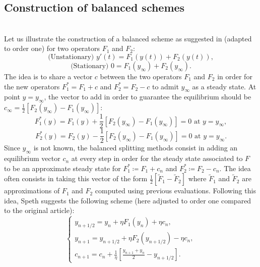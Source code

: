 \documentclass[article,authoryear,jmlmc]{beg_32}             %
\begin{document}
\subsection{Construction of balanced schemes}
~~\\
Let us illustrate the construction of a balanced scheme as suggested in \cite{rebalanced_splitting} (adapted to order one) for two operators $F_1$ and $F_2$:
\begin{equation*}
	\text{(Unstationary) } y'(t) = F_1(y(t)) + F_2(y(t)),
\end{equation*}
\begin{equation*}
	\text{(Stationary) } 0 = F_1(y_{\infty}) + F_2(y_{\infty}).
\end{equation*}
The idea is to share a vector $c$ between the two operators $F_1$ and $F_2$ in order for the new operators $F_1^* = F_1+c$ and $F_2^*=F_2-c$ to admit $y_{\infty}$ as a steady state. At point $y=y_{\infty}$, the vector to add in order to guarantee the equilibrium should be $c_{\infty} = \frac{1}{2} \left[F_2(y_{\infty})-F_1(y_{\infty})\right]$:
\begin{equation*}
	F_1^*(y) =  F_1(y) + \frac{1}{2} \left[F_2(y_{\infty})-F_1(y_{\infty})\right] = 0 \text{ at } y=y_{\infty},
\end{equation*}
\begin{equation*}
	F_2^*(y) =  F_2(y) - \frac{1}{2} \left[F_2(y_{\infty})-F_1(y_{\infty})\right] = 0 \text{ at } y=y_{\infty}.
\end{equation*}
Since $y_{\infty}$ is not known, the balanced splitting methods consist in adding an equilibrium vector $c_n$ at every step in order for the steady state associated to $F$ to be an approximate steady state for $F_1^* \coloneqq F_1+c_n$ and $F_2^*\coloneqq F_2-c_n$. The idea often consists in taking this vector of the form $\frac{1}{2}\left[\tilde{F}_1-\tilde{F}_2\right]$ where $\tilde{F}_1$ and $\tilde{F}_2$ are approximations of $F_1$ and $F_2$ computed using previous evaluations. Following this idea, Speth suggests the following scheme \cite{rebalanced_splitting} (here adjusted to order one compared to the original article):
\begin{equation}
	\left\{
	\begin{array}{ll}
		y_{n+1/2} = y_n+\eta F_1(y_n)+\eta c_n, \\
		y_{n+1} = y_{n+1/2}+\eta F_2(y_{n+1/2})-\eta c_n, \\
		c_{n+1} = c_n+\frac{1}{\eta}\left[\frac{y_{n+1}+y_n}{2}-y_{n+1/2}\right].
		\label{splitting_speth}
	\end{array}
	\right.
\end{equation}
\end{document}
